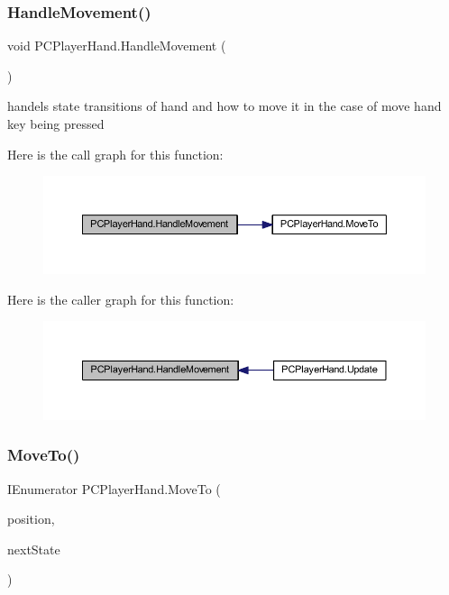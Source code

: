\subsubsection{\texorpdfstring{Handle\+Movement()}{HandleMovement()}}
{\footnotesize\ttfamily void P\+C\+Player\+Hand.\+Handle\+Movement (\begin{DoxyParamCaption}{ }\end{DoxyParamCaption})\hspace{0.3cm}{\ttfamily [private]}}



handels state transitions of hand and how to move it in the case of move hand key being pressed 

Here is the call graph for this function\+:
\nopagebreak
\begin{figure}[H]
\begin{center}
\leavevmode
\includegraphics[width=350pt]{class_p_c_player_hand_a81d7137403650fb8da125b6356d50496_cgraph}
\end{center}
\end{figure}
Here is the caller graph for this function\+:
\nopagebreak
\begin{figure}[H]
\begin{center}
\leavevmode
\includegraphics[width=350pt]{class_p_c_player_hand_a81d7137403650fb8da125b6356d50496_icgraph}
\end{center}
\end{figure}
\mbox{\label{class_p_c_player_hand_a338f6e5898a4953d48c046354ffef9e2}} 
\subsubsection{\texorpdfstring{Move\+To()}{MoveTo()}}
{\footnotesize\ttfamily I\+Enumerator P\+C\+Player\+Hand.\+Move\+To (\begin{DoxyParamCaption}\item[{Vector3}]{position,  }\item[{\mbox{\hyperlink{class_player_hand_a1af76750da713cbc88856161d8d5ac0e}{Hand\+State}}}]{next\+State }\end{DoxyParamCaption})\hspace{0.3cm}{\ttfamily [private]}}



